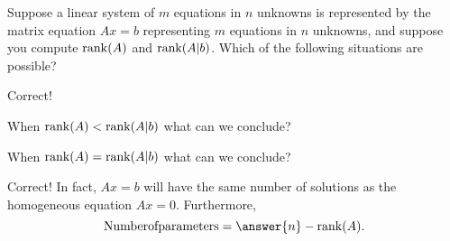\documentclass{ximera}
\begin{document}
\begin{question}
Suppose a linear system of $m$ equations in $n$ unknowns is represented by the matrix equation $Ax=b$ representing $m$ equations in $n$ unknowns, 
and suppose you compute ${\rm rank}(A)$ and ${\rm rank}(A|b)$.  Which of the following situations are possible? 
\begin{selectAll}
\end{selectAll}

\begin{question}
Correct!  

When ${\rm rank}(A) < {\rm rank}(A|b)$ what can we conclude? 
\begin{multipleChoice}
\end{multipleChoice}

When ${\rm rank}(A) = {\rm rank}(A|b)$ what can we conclude? 
\begin{multipleChoice}
\end{multipleChoice}

\begin{question}
Correct!  In fact, $Ax=b$ will have the same number of solutions as the homogeneous equation $Ax=0$.  
Furthermore, 
\[
{\rm Number of parameters }= \answer{n} - {\rm rank}(A). 
\]
\end{question}
\end{question}
\end{question}
\end{document}
